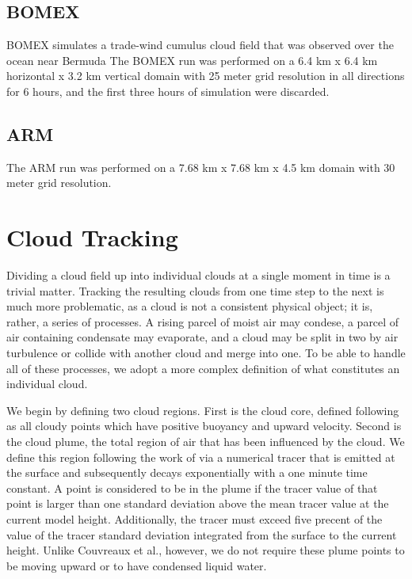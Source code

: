 \documentclass[acp]{copernicus}
\begin{document}
\subsection{BOMEX}

BOMEX simulates a trade-wind cumulus cloud field that was observed over the 
ocean near Bermuda
The BOMEX run was performed on a 6.4 km x 6.4 km horizontal x 3.2 km vertical 
domain with 25 meter grid resolution in all directions for 6 hours, and the 
first three hours of simulation were discarded. 

\subsection{ARM}

The ARM run was performed on a 7.68 km x 7.68 km x 4.5 km domain with 30 meter 
grid resolution.



\section{Cloud Tracking}

Dividing a cloud field up into individual clouds at a single moment in time is 
a trivial matter.  Tracking the resulting clouds from one time step to the 
next is much more problematic, as a cloud is not a consistent physical object; 
it is, rather, a series of processes.  A rising parcel of moist air may 
condese, a parcel of air containing condensate may evaporate, and a cloud may 
be split in two by air turbulence or collide with another cloud and merge into 
one.  To be able to handle all of these processes, we adopt a more complex 
definition of what constitutes an individual cloud.

We begin by defining two cloud regions.  First is the cloud core, defined following 
\cite{Siebesma1995} as all cloudy points which have positive buoyancy and 
upward velocity.  Second is the cloud plume, the total region of air that has 
been influenced by the cloud.  We define this region following the work of 
\cite{Couvreaux2010} via a numerical tracer that is emitted at the surface and 
subsequently decays exponentially with a one minute time constant.  A point is 
considered to be in the plume if the tracer value of that point is larger than 
one standard deviation above the mean tracer value at the current model height.
Additionally, the tracer must exceed five precent of the value of the tracer 
standard deviation integrated from the surface to the current height.  Unlike 
Couvreaux et al., however, we do not require these plume points to be moving 
upward or to have condensed liquid water.
\end{document}
